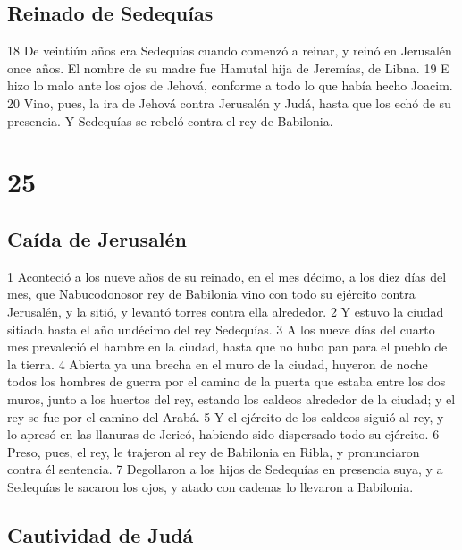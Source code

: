 \section*{Reinado de Sedequías}

18 De veintiún años era Sedequías cuando comenzó a reinar, y reinó en Jerusalén once años. El nombre de su madre fue Hamutal hija de Jeremías, de Libna.
19 E hizo lo malo ante los ojos de Jehová, conforme a todo lo que había hecho Joacim.
20 Vino, pues, la ira de Jehová contra Jerusalén y Judá, hasta que los echó de su presencia. Y Sedequías se rebeló contra el rey de Babilonia. 

\chapter{25}

\section*{Caída de Jerusalén }

1 Aconteció a los nueve años de su reinado, en el mes décimo, a los diez días del mes, que Nabucodonosor rey de Babilonia vino con todo su ejército contra Jerusalén, y la sitió, y levantó torres contra ella alrededor. 
2 Y estuvo la ciudad sitiada hasta el año undécimo del rey Sedequías.
3 A los nueve días del cuarto mes prevaleció el hambre en la ciudad, hasta que no hubo pan para el pueblo de la tierra.
4 Abierta ya una brecha en el muro de la ciudad, huyeron de noche todos los hombres de guerra por el camino de la puerta que estaba entre los dos muros, junto a los huertos del rey, estando los caldeos alrededor de la ciudad; y el rey se fue por el camino del Arabá.
5 Y el ejército de los caldeos siguió al rey, y lo apresó en las llanuras de Jericó, habiendo sido dispersado todo su ejército.
6 Preso, pues, el rey, le trajeron al rey de Babilonia en Ribla, y pronunciaron contra él sentencia.
7 Degollaron a los hijos de Sedequías en presencia suya, y a Sedequías le sacaron los ojos, y atado con cadenas lo llevaron a Babilonia. 

\section*{Cautividad de Judá}

